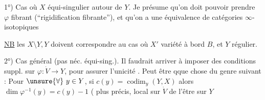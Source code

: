 
1°) Cas où $X$ équi-singulier autour de $Y$.
Je présume qu'on doit pouvoir prendre
$\varphi$ fibrant (``rigidification fibrante''),
et qu'on a une équivalence de catégories
$\infty$-isotopiques


\uline{NB} les $X\setminus Y,Y$
doivent correspondre au cas où
$X'$ variété à bord $B$, et $Y$ régulier.


2°) Cas général (pas néc. équi-sing.).
Il faudrait arriver à imposer des
conditions suppl. sur $\varphi:\dot V\longrightarrow Y$,
pour assurer l'unicité .
Peut être qque chose du genre
suivant : Pour $\unsure{\forall}\ y\in Y$, si $c(y)=\operatorname{codim}_y(Y,X)$
alors $\dim\varphi^{-1}(y)=c(y)-1$
( plus précis, local sur $\dot V$  de l'être sur $Y$
